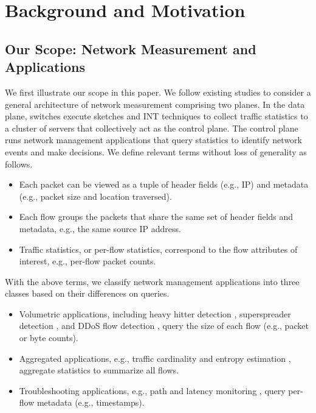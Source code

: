 \section{Background and Motivation}

\subsection{Our Scope: Network Measurement and Applications}

We first illustrate our scope in this paper. We follow existing studies \cite{namkung2022sketchlib,anup2022hetero,liu2016one} to consider a general architecture of network measurement comprising two planes. In the data plane, switches execute sketches and INT techniques to collect traffic statistics to a cluster of servers that collectively act as the control plane. The control plane runs network management applications that query statistics to identify network events and make decisions. We define relevant terms without loss of generality as follows.

\begin{itemize}[leftmargin=*]
%
    \item Each packet can be viewed as a tuple of header fields (e.g., IP) and metadata (e.g., packet size and location traversed).
%
    \item Each flow groups the packets that share the same set of header fields and metadata, e.g., the same source IP address. 
%
    \item Traffic statistics, or per-flow statistics, correspond to the flow attributes of interest, e.g., per-flow packet counts. 
%
\end{itemize}

\noindent With the above terms, we classify network management applications into three classes based on their differences on queries.

\begin{itemize}[leftmargin=*]
%
    \item Volumetric applications, including heavy hitter detection \cite{huang2017sketchvisor}, superspreader detection \cite{tang2019mv}, and DDoS flow detection \cite{liu2021jaqen}, query the size of each flow (e.g., packet or byte counts). 
%
    \item Aggregated applications, e.g., traffic cardinality and entropy estimation \cite{liu2016one}, aggregate statistics to summarize all flows. 
%
    \item Troubleshooting applications, e.g., path and latency monitoring \cite{ben2020pint,sheng2021deltaint}, query per-flow metadata (e.g., timestamps).
%
\end{itemize}

